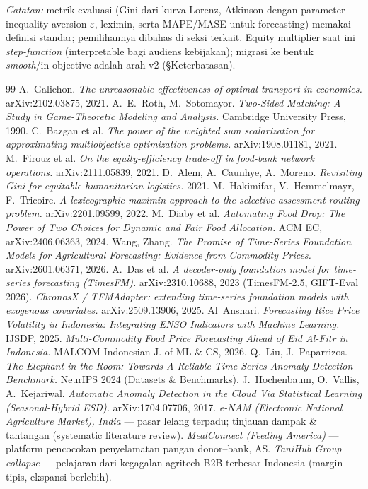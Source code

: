 \documentclass[11pt,a4paper]{article}
\begin{document}
\noindent\emph{Catatan:} metrik evaluasi (Gini dari kurva Lorenz, Atkinson dengan parameter
inequality-aversion $\varepsilon$, leximin, serta MAPE/MASE untuk forecasting) memakai definisi
standar; pemilihannya dibahas di seksi terkait. Equity multiplier saat ini \emph{step-function}
(interpretable bagi audiens kebijakan); migrasi ke bentuk \emph{smooth}/in-objective adalah arah v2
(\S Keterbatasan).

\begin{thebibliography}{99}
 A.~Galichon. \emph{The unreasonable effectiveness of optimal transport in economics.} arXiv:2102.03875, 2021.
 A.~E.~Roth, M.~Sotomayor. \emph{Two-Sided Matching: A Study in Game-Theoretic Modeling and Analysis.} Cambridge University Press, 1990.
 C.~Bazgan et al. \emph{The power of the weighted sum scalarization for approximating multiobjective optimization problems.} arXiv:1908.01181, 2021.
 M.~Firouz et al. \emph{On the equity-efficiency trade-off in food-bank network operations.} arXiv:2111.05839, 2021.
 D.~Alem, A.~Caunhye, A.~Moreno. \emph{Revisiting Gini for equitable humanitarian logistics.} 2021.
 M.~Hakimifar, V.~Hemmelmayr, F.~Tricoire. \emph{A lexicographic maximin approach to the selective assessment routing problem.} arXiv:2201.09599, 2022.
 M.~Diaby et al. \emph{Automating Food Drop: The Power of Two Choices for Dynamic and Fair Food Allocation.} ACM EC, arXiv:2406.06363, 2024.
 Wang, Zhang. \emph{The Promise of Time-Series Foundation Models for Agricultural Forecasting: Evidence from Commodity Prices.} arXiv:2601.06371, 2026.
 A.~Das et al. \emph{A decoder-only foundation model for time-series forecasting (TimesFM).} arXiv:2310.10688, 2023 (TimesFM-2.5, GIFT-Eval 2026).
 \emph{ChronosX / TFMAdapter: extending time-series foundation models with exogenous covariates.} arXiv:2509.13906, 2025.
 Al~Anshari. \emph{Forecasting Rice Price Volatility in Indonesia: Integrating ENSO Indicators with Machine Learning.} IJSDP, 2025.
 \emph{Multi-Commodity Food Price Forecasting Ahead of Eid Al-Fitr in Indonesia.} MALCOM Indonesian J. of ML \& CS, 2026.
 Q.~Liu, J.~Paparrizos. \emph{The Elephant in the Room: Towards A Reliable Time-Series Anomaly Detection Benchmark.} NeurIPS 2024 (Datasets \& Benchmarks).
 J.~Hochenbaum, O.~Vallis, A.~Kejariwal. \emph{Automatic Anomaly Detection in the Cloud Via Statistical Learning (Seasonal-Hybrid ESD).} arXiv:1704.07706, 2017.
 \emph{e-NAM (Electronic National Agriculture Market), India} --- pasar lelang terpadu; tinjauan dampak \& tantangan (systematic literature review).
 \emph{MealConnect (Feeding America)} --- platform pencocokan penyelamatan pangan donor--bank, AS.
 \emph{TaniHub Group collapse} --- pelajaran dari kegagalan agritech B2B terbesar Indonesia (margin tipis, ekspansi berlebih).
\end{thebibliography}
\end{document}
